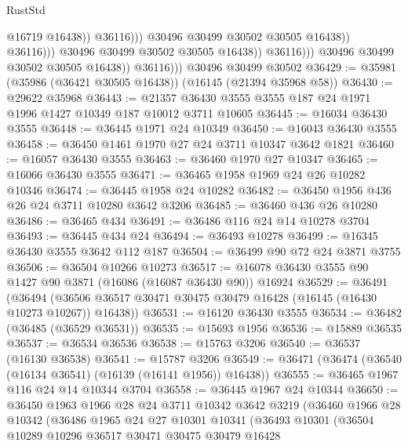 \begin{lexlean}{RustStd}
\begin{coremodule}
                                            @16719
                                            @16438))
                                        @36116)))
                                  @30496
                                  @30499
                                  @30502
                                  @30505
                                  @16438))
                              @36116)))
                        @30496
                        @30499
                        @30502
                        @30505
                        @16438))
                    @36116)))
              @30496
              @30499
              @30502
              @30505
              @16438))
          @36116)))
    @30496
    @30499
    @30502
@36429 := @35981 (@35986 (@36421 @30505 @16438)) (@16145 (@21394 @35968 @58))
@36430 := @29622 @35968
@36443 := @21357 @36430 @3555 @3555 @187 @24 @1971 @1996 @1427 @10349 @187 @10012 @3711 @10605
@36445 := @16034 @36430 @3555
@36448 := @36445 @1971 @24 @10349
@36450 := @16043 @36430 @3555
@36458 := @36450 @1461 @1970 @27 @24 @3711 @10347 @3642 @1821
@36460 := @16057 @36430 @3555
@36463 := @36460 @1970 @27 @10347
@36465 := @16066 @36430 @3555
@36471 := @36465 @1958 @1969 @24 @26 @10282 @10346
@36474 := @36445 @1958 @24 @10282
@36482 := @36450 @1956 @436 @26 @24 @3711 @10280 @3642 @3206
@36485 := @36460 @436 @26 @10280
@36486 := @36465 @434
@36491 := @36486 @116 @24 @14 @10278 @3704
@36493 := @36445 @434 @24
@36494 := @36493 @10278
@36499 := @16345 @36430 @3555 @3642 @112 @187
@36504 := @36499 @90 @72 @24 @3871 @3755
@36506 := @36504 @10266 @10273
@36517 := @16078 @36430 @3555 @90 @1427 @90 @3871 (@16086 (@16087 @36430 @90)) @16924
@36529 := @36491
    (@36494 (@36506 @36517 @30471 @30475 @30479 @16428 (@16145 (@16430 @10273 @10267)) @16438))
@36531 := @16120 @36430 @3555
@36534 := @36482 (@36485 (@36529 @36531))
@36535 := @15693 @1956
@36536 := @15889 @36535
@36537 := @36534 @36536
@36538 := @15763 @3206
@36540 := @36537 (@16130 @36538)
@36541 := @15787 @3206
@36549 := @36471 (@36474 (@36540 (@16134 @36541) (@16139 (@16141 @1956)) @16438))
@36555 := @36465 @1967 @116 @24 @14 @10344 @3704
@36558 := @36445 @1967 @24 @10344
@36650 := @36450
    @1963
    @1966
    @28
    @24
    @3711
    @10342
    @3642
    @3219
    (@36460
      @1966
      @28
      @10342
      (@36486
        @1965
        @24
        @27
        @10301
        @10341
        (@36493
          @10301
          (@36504
            @10289
            @10296
            @36517
            @30471
            @30475
            @30479
            @16428

\end{coremodule}
\end{lexlean}
